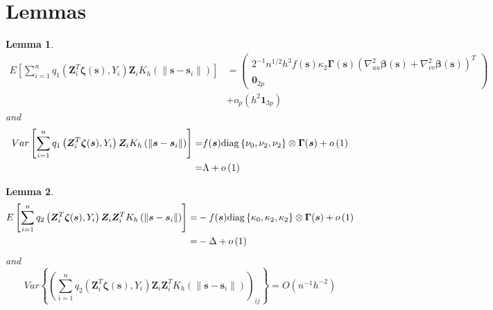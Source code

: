 \documentclass[authoryear,review, 12pt]{elsarticle}
\newtheorem{lem}{Lemma}
\begin{document}
\section{Lemmas}
\begin{lem}
\label{lemma:omega}
\begin{align*}
E\left[\sum_{i=1}^{n}q_{1}\left(\bm{Z}_{i}^{T}\bm{\zeta}(\bm{s}),Y_{i}\right)\bm{Z}_{i}K_{h}\left(\|\bm{s}-\bm{s}_{i}\|\right)\right] &= \left(\begin{array}{c}
2^{-1}n^{1/2}h^{3}f(\bm{s})\kappa_{2}\bm{\Gamma}(\bm{s})\left(\nabla_{uu}^{2}\bm{\beta}(\bm{s})+\nabla_{vv}^{2}\bm{\beta}(\bm{s})\right)^{T}\\
\bm{0}_{2p}
\end{array}\right) \\
&+o_{p}\left(h^{2}\bm{1}_{3p}\right)
\end{align*}
and
\begin{align*}
Var\left[\sum_{i=1}^{n}q_{1}\left(\bm{Z}_{i}^{T}\bm{\zeta}(\bm{s}),Y_{i}\right)\bm{Z}_{i}K_{h}\left(\|\bm{s}-\bm{s}_{i}\|\right)\right]= & f(\bm{s}){\rm diag}\left\{ \nu_{0},\nu_{2},\nu_{2}\right\} \otimes\bm{\Gamma}(\bm{s})+o\left(1\right)\\
= & \Lambda+o\left(1\right)
\end{align*}
\end{lem}

\begin{lem}
\label{lemma:delta}
\begin{align*}
E\left[\sum_{i=1}^{n}q_{2}\left(\bm{Z}_{i}^{T}\bm{\zeta}(\bm{s}),Y_{i}\right)\bm{Z}_{i}\bm{Z}_{i}^{T}K_{h}\left(\|\bm{s}-\bm{s}_{i}\|\right)\right]= & -f(\bm{s}){\rm diag}\left\{ \kappa_{0},\kappa_{2},\kappa_{2}\right\} \otimes\bm{\Gamma}(\bm{s})+o\left(1\right)\\
= & -\Delta+o\left(1\right)
\end{align*}
and
\[
Var\left\{ \left(\sum_{i=1}^{n}q_{2}\left(\bm{Z}_{i}^{T}\bm{\zeta}(\bm{s}),Y_{i}\right)\bm{Z}_{i}\bm{Z}_{i}^{T}K_{h}\left(\|\bm{s}-\bm{s}_{i}\|\right)\right)_{ij}\right\} =O\left(n^{-1}h^{-2}\right)
\]
\end{lem}



\end{document}
